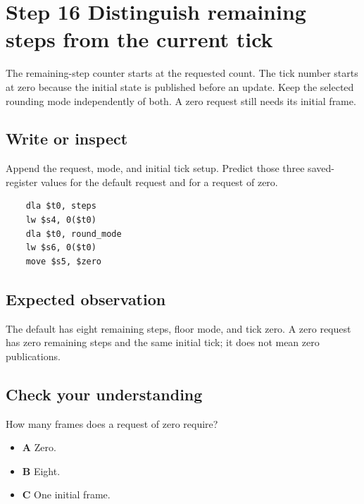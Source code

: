\section{Step 16 Distinguish remaining steps from the current tick}\label{ball-s16}

The remaining-step counter starts at the requested count. The tick number starts at zero because the initial state is published before an update. Keep the selected rounding mode independently of both. A zero request still needs its initial frame.

\subsection{Write or inspect}
Append the request, mode, and initial tick setup. Predict those three saved-register values for the default request and for a request of zero.

\begin{verbatim}
    dla $t0, steps
    lw $s4, 0($t0)
    dla $t0, round_mode
    lw $s6, 0($t0)
    move $s5, $zero
\end{verbatim}

\subsection{Expected observation}
The default has eight remaining steps, floor mode, and tick zero. A zero request has zero remaining steps and the same initial tick; it does not mean zero publications.

\subsection{Check your understanding}
How many frames does a request of zero require?

\begin{itemize}
  \item \textbf{A} Zero.
  \item \textbf{B} Eight.
  \item \textbf{C} One initial frame.
\end{itemize}

